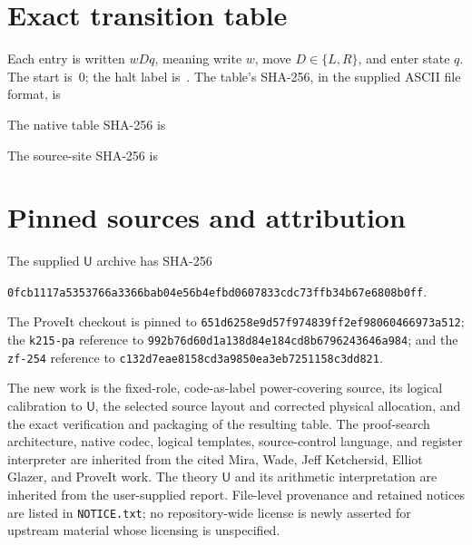 \documentclass[11pt]{article}
\newcommand{\ThU}{\mathsf U}
\theoremstyle{definition}\newtheorem{definition}[theorem]{Definition}
\begin{document}
\appendix
\section{Exact transition table}

Each entry is written $wDq$, meaning write $w$, move $D\in\{L,R\}$,
and enter state $q$. The start is~0; the halt label is~\Nstates.
The table's SHA-256, in the supplied ASCII file format, is
\begin{center}\small\texttt{\DenseHash}\end{center}
The native table SHA-256 is
\begin{center}\small\texttt{\NativeHash}\end{center}
The source-site SHA-256 is
\begin{center}\small\texttt{\SourceHash}\end{center}


\section{Pinned sources and attribution}

The supplied $\ThU$ archive has SHA-256
\begin{center}\small
\texttt{0fcb1117a5353766a3366bab04e56b4efbd0607833cdc73ffb34b67e6808b0ff}.
\end{center}
The ProveIt checkout is pinned to
\texttt{651d6258e9d57f974839ff2ef98060466973a512}; the
\texttt{k215-pa} reference to
\texttt{992b76d60d1a138d84e184cd8b6796243646a984}; and the
\texttt{zf-254} reference to
\texttt{c132d7eae8158cd3a9850ea3eb7251158c3dd821}.

The new work is the fixed-role, code-as-label power-covering source,
its logical calibration to $\ThU$, the selected source layout and corrected
physical allocation, and the exact verification and packaging of the
resulting table. The proof-search architecture, native codec, logical
templates, source-control language, and register interpreter are inherited
from the cited Mira, Wade, Jeff Ketchersid, Elliot Glazer, and ProveIt work.
The theory $\ThU$ and its arithmetic interpretation are inherited from the
user-supplied report. File-level provenance and retained notices are
listed in \texttt{NOTICE.txt}; no repository-wide license is newly asserted
for upstream material whose licensing is unspecified.
\end{document}
